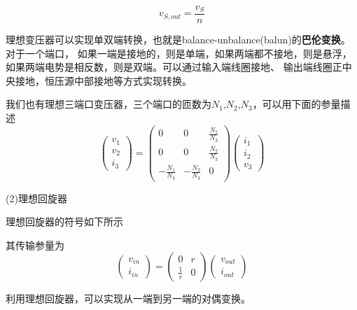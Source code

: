     \[
    v_{S,out}=\frac{v_S}{n}    
    \]
    \par 理想变压器可以实现单双端转换，也就是balance-unbalance(balun)的\textbf{巴伦变换}。对于一个端口，
    如果一端是接地的，则是单端，如果两端都不接地，则是悬浮，如果两端电势是相反数，则是双端。可以通过输入端线圈接地、
    输出端线圈正中央接地，恒压源中部接地等方式实现转换。
    \par 我们也有理想三端口变压器，三个端口的匝数为$N_1$,$N_2$,$N_3$，可以用下面的参量描述
    \[
    \begin{pmatrix}
        v_1 \\ v_2 \\ i_3
    \end{pmatrix}  
    =
    \begin{pmatrix}
        0 & 0 & \frac{N_1}{N_3}\\
        0 & 0 & \frac{N_2}{N_3}\\
        -\frac{N_1}{N_3} & -\frac{N_2}{N_3} & 0
    \end{pmatrix}  
    \begin{pmatrix}
        i_1 \\ i_2 \\ v_3
    \end{pmatrix}
    \]
    \par (2)理想回旋器
    \par 理想回旋器的符号如下所示
    \begin{center}
    \end{center}
    \par 其传输参量为
    \[
    \begin{pmatrix}
        v_{in} \\ i_{in}
    \end{pmatrix}
    =
    \begin{pmatrix}
        0 & r \\ \frac{1}{r} & 0
    \end{pmatrix}
    \begin{pmatrix}
        v_{out} \\ i_{out}
    \end{pmatrix}   
    \]
    \par 利用理想回旋器，可以实现从一端到另一端的对偶变换。
